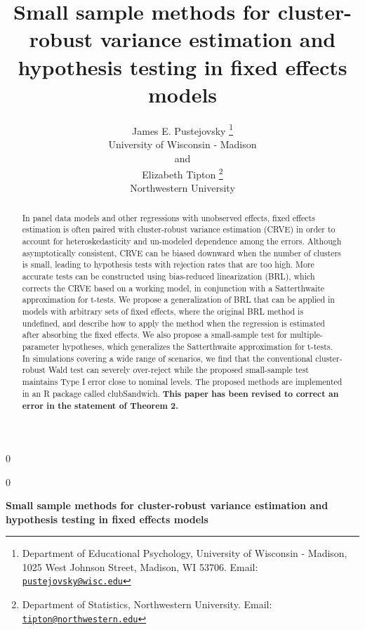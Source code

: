\documentclass[12pt]{article}
\newcommand{\blind}{0}
\begin{document}
\def\spacingset#1{\renewcommand{\baselinestretch}%
{#1}\small\normalsize} \spacingset{1}



\blind
{
  \title{\bf Small sample methods for cluster-robust variance estimation
and hypothesis testing in fixed effects models}

  \author{
        James E. Pustejovsky \thanks{Department of Educational
Psychology, University of Wisconsin - Madison, 1025 West Johnson Street,
Madison, WI 53706. Email:
\href{mailto:pustejovsky@wisc.edu}{\nolinkurl{pustejovsky@wisc.edu}}} \\
    University of Wisconsin - Madison\\
     and \\     Elizabeth Tipton \thanks{Department of Statistics,
Northwestern University. Email:
\href{mailto:tipton@northwestern.edu}{\nolinkurl{tipton@northwestern.edu}}} \\
    Northwestern University\\
      }
  \maketitle
} \fi

\blind
{
  \bigskip
  \bigskip
  \bigskip
  \begin{center}
    {\LARGE\bf Small sample methods for cluster-robust variance
estimation and hypothesis testing in fixed effects models}
  \end{center}
  \medskip
} \fi

\bigskip
\begin{abstract}
In panel data models and other regressions with unobserved effects,
fixed effects estimation is often paired with cluster-robust variance
estimation (CRVE) in order to account for heteroskedasticity and
un-modeled dependence among the errors. Although asymptotically
consistent, CRVE can be biased downward when the number of clusters is
small, leading to hypothesis tests with rejection rates that are too
high. More accurate tests can be constructed using bias-reduced
linearization (BRL), which corrects the CRVE based on a working model,
in conjunction with a Satterthwaite approximation for t-tests. We
propose a generalization of BRL that can be applied in models with
arbitrary sets of fixed effects, where the original BRL method is
undefined, and describe how to apply the method when the regression is
estimated after absorbing the fixed effects. We also propose a
small-sample test for multiple-parameter hypotheses, which generalizes
the Satterthwaite approximation for t-tests. In simulations covering a
wide range of scenarios, we find that the conventional cluster-robust
Wald test can severely over-reject while the proposed small-sample test
maintains Type I error close to nominal levels. The proposed methods are
implemented in an R package called clubSandwich. \textbf{This paper has
been revised to correct an error in the statement of Theorem 2.}
\end{abstract}
\end{document}
